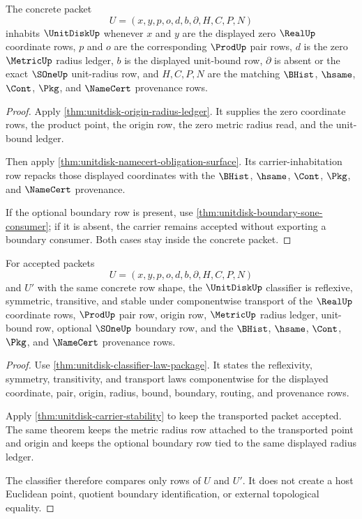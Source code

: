\begin{theorem}
\label{thm:unitdisk-carrier-habitation}
The concrete packet
$$
U=(x,y,p,o,d,b,\partial,H,C,P,N)
$$
inhabits $\UnitDiskUp$ whenever $x$ and $y$ are the displayed zero $\RealUp$ coordinate rows, $p$ and $o$ are the corresponding $\ProdUp$ pair rows, $d$ is the zero $\MetricUp$ radius ledger, $b$ is the displayed unit-bound row, $\partial$ is absent or the exact $\SOneUp$ unit-radius row, and $H,C,P,N$ are the matching $\BHist$, $\hsame$, $\Cont$, $\Pkg$, and $\NameCert$ provenance rows.
\end{theorem}
\begin{proof}
Apply \autoref{thm:unitdisk-origin-radius-ledger}. It supplies the zero coordinate rows, the product point, the origin row, the zero metric radius read, and the unit-bound ledger.

Then apply \autoref{thm:unitdisk-namecert-obligation-surface}. Its carrier-inhabitation row repacks those displayed coordinates with the $\BHist$, $\hsame$, $\Cont$, $\Pkg$, and $\NameCert$ provenance.

If the optional boundary row is present, use \autoref{thm:unitdisk-boundary-sone-consumer}; if it is absent, the carrier remains accepted without exporting a boundary consumer. Both cases stay inside the concrete packet.
\end{proof}

\begin{theorem}
\label{thm:unitdisk-classifier-laws}
For accepted packets
$$
U=(x,y,p,o,d,b,\partial,H,C,P,N)
$$
and $U'$ with the same concrete row shape, the $\UnitDiskUp$ classifier is reflexive, symmetric, transitive, and stable under componentwise transport of the $\RealUp$ coordinate rows, $\ProdUp$ pair row, origin row, $\MetricUp$ radius ledger, unit-bound row, optional $\SOneUp$ boundary row, and the $\BHist$, $\hsame$, $\Cont$, $\Pkg$, and $\NameCert$ provenance rows.
\end{theorem}
\begin{proof}
Use \autoref{thm:unitdisk-classifier-law-package}. It states the reflexivity, symmetry, transitivity, and transport laws componentwise for the displayed coordinate, pair, origin, radius, bound, boundary, routing, and provenance rows.

Apply \autoref{thm:unitdisk-carrier-stability} to keep the transported packet accepted. The same theorem keeps the metric radius row attached to the transported point and origin and keeps the optional boundary row tied to the same displayed radius ledger.

The classifier therefore compares only rows of $U$ and $U'$. It does not create a host Euclidean point, quotient boundary identification, or external topological equality.
\end{proof}

